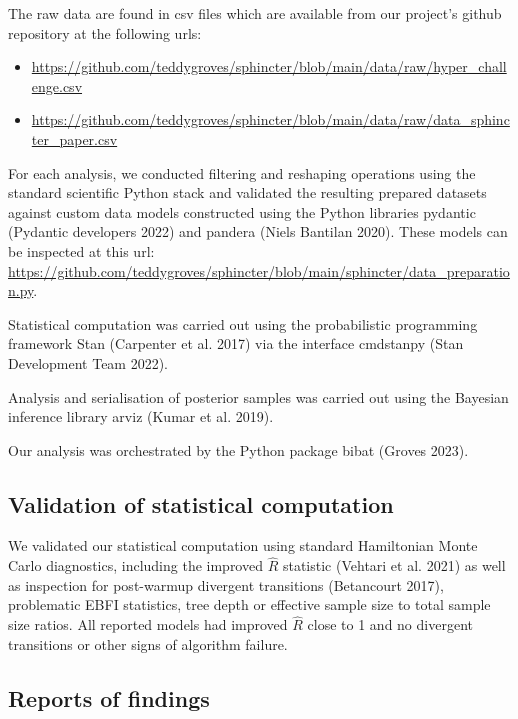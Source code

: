 \documentclass[
  letterpaper,
  DIV=11,
  numbers=noendperiod,
  oneside]{scrartcl}
\providecommand{\tightlist}{%
  \setlength{\itemsep}{0pt}\setlength{\parskip}{0pt}}\usepackage{longtable,booktabs,array}
\theoremstyle{plain}
\theoremstyle{remark}
\begin{document}
The raw data are found in csv files which are available from our
project's github repository at the following urls:

\begin{itemize}
\tightlist
\item
  \url{https://github.com/teddygroves/sphincter/blob/main/data/raw/hyper_challenge.csv}
\item
  \url{https://github.com/teddygroves/sphincter/blob/main/data/raw/data_sphincter_paper.csv}
\end{itemize}

For each analysis, we conducted filtering and reshaping operations using
the standard scientific Python stack and validated the resulting
prepared datasets against custom data models constructed using the
Python libraries pydantic (Pydantic developers 2022) and pandera (Niels
Bantilan 2020). These models can be inspected at this url:
\url{https://github.com/teddygroves/sphincter/blob/main/sphincter/data_preparation.py}.

Statistical computation was carried out using the probabilistic
programming framework Stan (Carpenter et al. 2017) via the interface
cmdstanpy (Stan Development Team 2022).

Analysis and serialisation of posterior samples was carried out using
the Bayesian inference library arviz (Kumar et al. 2019).

Our analysis was orchestrated by the Python package bibat (Groves 2023).

\subsection{Validation of statistical
computation}\label{validation-of-statistical-computation}

We validated our statistical computation using standard Hamiltonian
Monte Carlo diagnostics, including the improved \(\hat{R}\) statistic
(Vehtari et al. 2021) as well as inspection for post-warmup divergent
transitions (Betancourt 2017), problematic EBFI statistics, tree depth
or effective sample size to total sample size ratios. All reported
models had improved \(\hat{R}\) close to 1 and no divergent transitions
or other signs of algorithm failure.

\subsection{Reports of findings}\label{reports-of-findings}
\end{document}
